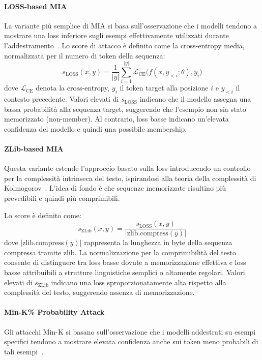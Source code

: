 \paragraph{LOSS-based MIA}
La variante più semplice di MIA si basa sull’osservazione che i modelli tendono a mostrare una loss inferiore sugli esempi effettivamente utilizzati durante l’addestramento~\cite{yeom2018privacyriskmachinelearning}.  
Lo score di attacco è definito come la cross-entropy media, normalizzata per il numero di token della sequenza:
\[
s_{\text{LOSS}}(x, y) = \frac{1}{|y|} \sum_{i=1}^{|y|} 
\mathcal{L}_{\text{CE}}\bigl(f(x, y_{<i}; \theta), y_i\bigr)
\]
dove $\mathcal{L}_{\text{CE}}$ denota la cross-entropy, $y_i$ il token target alla posizione $i$ e $y_{<i}$ il contesto precedente.
Valori elevati di $s_{\text{LOSS}}$ indicano che il modello assegna una bassa probabilità alla sequenza target, suggerendo che l’esempio non sia stato memorizzato (non-member). Al contrario, loss basse indicano un’elevata confidenza del modello e quindi una possibile membership.

\paragraph{ZLib-based MIA}
Questa variante estende l’approccio basato sulla loss introducendo un controllo per la complessità intrinseca del testo, ispirandosi alla teoria della complessità di Kolmogorov~\cite{274574}.  
L’idea di fondo è che sequenze memorizzate risultino più prevedibili e quindi più comprimibili.

Lo score è definito come:
\[
s_{\text{ZLib}}(x, y) = \frac{s_{\text{LOSS}}(x, y)}{|\text{zlib.compress}(y)|}
\]
dove $|\text{zlib.compress}(y)|$ rappresenta la lunghezza in byte della sequenza compressa tramite zlib.
La normalizzazione per la comprimibilità del testo consente di distinguere tra loss basse dovute a memorizzazione effettiva e loss basse attribuibili a strutture linguistiche semplici o altamente regolari. Valori elevati di $s_{\text{ZLib}}$ indicano una loss sproporzionatamente alta rispetto alla complessità del testo, suggerendo assenza di memorizzazione.

\paragraph{Min-K\% Probability Attack}
Gli attacchi Min-K si basano sull’osservazione che i modelli addestrati su esempi specifici tendono a mostrare elevata confidenza anche sui token meno probabili di tali esempi~\cite{shi2024detectingpretrainingdatalarge}.  

